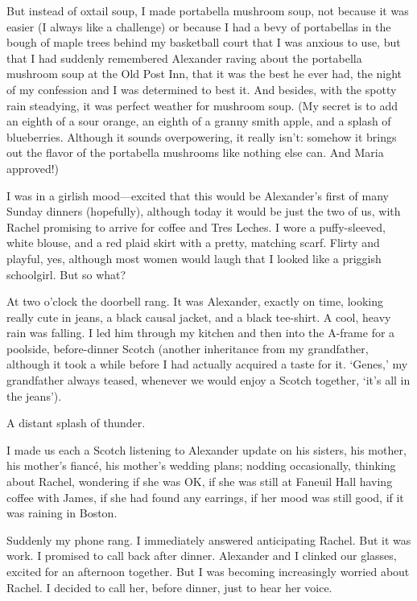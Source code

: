 But instead of oxtail soup, I made portabella mushroom soup, not because
it was easier (I always like a challenge) or because I had a bevy of
portabellas in the bough of maple trees behind my basketball court that
I was anxious to use, but that I had suddenly remembered Alexander
raving about the portabella mushroom soup at the Old Post Inn, that it
was the best he ever had, the night of my confession and I was
determined to best it. And besides, with the spotty rain steadying, it
was perfect weather for mushroom soup. (My secret is to add an eighth of
a sour orange, an eighth of a granny smith apple, and a splash of
blueberries. Although it sounds overpowering, it really isn't: somehow
it brings out the flavor of the portabella mushrooms like nothing else
can. And Maria approved!)

I was in a girlish mood---excited that this would be Alexander's first
of many Sunday dinners (hopefully), although today it would be just the
two of us, with Rachel promising to arrive for coffee and Tres Leches. I
wore a puffy-sleeved, white blouse, and a red plaid skirt with a pretty,
matching scarf. Flirty and playful, yes, although most women would laugh
that I looked like a priggish schoolgirl. But so what?

At two o'clock the doorbell rang. It was Alexander, exactly on time,
looking really cute in jeans, a black causal jacket, and a black
tee-shirt. A cool, heavy rain was falling. I led him through my kitchen
and then into the A-frame for a poolside, before-dinner Scotch (another
inheritance from my grandfather, although it took a while before I had
actually acquired a taste for it. `Genes,' my grandfather always teased,
whenever we would enjoy a Scotch together, `it's all in the jeans').

A distant splash of thunder.

I made us each a Scotch listening to Alexander update on his sisters,
his mother, his mother's fiancé, his mother's wedding plans; nodding
occasionally, thinking about Rachel, wondering if she was OK, if she was
still at Faneuil Hall having coffee with James, if she had found any
earrings, if her mood was still good, if it was raining in Boston.

Suddenly my phone rang. I immediately answered anticipating Rachel. But
it was work. I promised to call back after dinner. Alexander and I
clinked our glasses, excited for an afternoon together. But I was
becoming increasingly worried about Rachel. I decided to call her,
before dinner, just to hear her voice.

